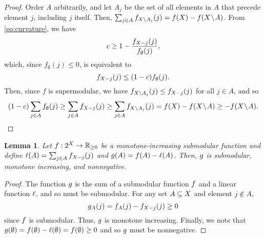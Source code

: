 \documentclass{article}
\newcommand{\reals}{\ensuremath{\mathbb{R}}}
\newcommand{\posreals}{\ensuremath{\reals_{\ge 0}}}
\newtheorem{lemma}[theorem]{Lemma}
\theoremstyle{definition}
\begin{document}
\supmodcurv*
\begin{proof}
Order $A$ arbitrarily, and let $A_{j}$ be the set of all elements in $A$ that precede element $j$, including $j$ itself.  Then, 
$\sum_{j \in A}f_{X \setminus A_{j}}(j) = f(X) - f(X \!\setminus\! A)$.
From \eqref{eq:curvature}, we have
\[c \ge 1 - \frac{f_{X - j}(j)}{f_{\emptyset}(j)},
\]
which, since $f_{\emptyset}(j) \le 0$, is equivalent to
\[
f_{X - j}(j) \le (1-c)f_{\emptyset}(j).
\]
Then, since $f$ is supermodular, we have $f_{X \setminus A_{j}}(j) \le f_{X - j}(j)$ for all $j \in A$,  and so
\begin{equation*}
(1 - c)\sum_{j \in A}f_{\emptyset}(j) \ge 
\sum_{j \in A}f_{X - j}(j) \ge
\sum_{j \in A}f_{X \setminus A_{j}}(j)
= f(X) - f(X \!\setminus\! A) \ge -f(X \!\setminus\! A).
\end{equation*}
\end{proof}

\begin{lemma}
\label{lem:submod-app}
Let $\obj : 2^{\ground} \to \posreals$ be a monotone-increasing submodular function and define $\ell(A) = \sum_{j \in A}f_{X - j}(j)$ and $g(A) = f(A) - \ell(A)$.  Then, $g$ is submodular,  monotone increasing, and nonnegative.
\end{lemma}
\begin{proof}
The function $g$ is the sum of a submodular function $f$ and a linear function $\ell$, and so must be submodular.  For any set $A \subseteq X$ and element $j \not\in A$,
\[g_{A}(j) = f_{A}(j) - f_{X - j}(j) \ge 0\]
since $f$ is submodular.
Thus, $g$ is monotone increasing.  Finally, we note that $g(\emptyset) = f(\emptyset) - \ell(\emptyset) = f(\emptyset) \ge 0$ and so $g$ must be nonnegative.
\end{proof}
\end{document}
